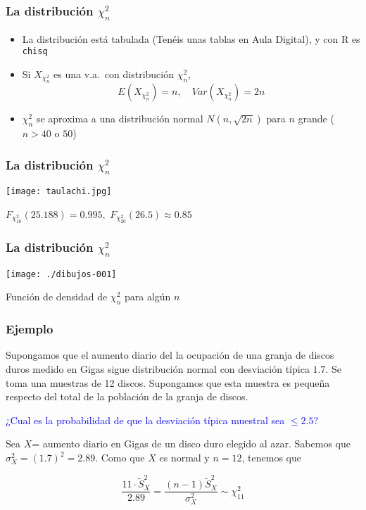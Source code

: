 \documentclass[12pt,t]{beamer}
\newcommand{\blue}[1]{\textcolor{blue}{#1}}
\renewcommand{\emph}[1]{{\color{red}#1}}
\renewcommand{\leq}{\leqslant}
\theoremstyle{plain}
\theoremstyle{definition}
\begin{document}
\begin{frame}
\frametitle{La distribución $\chi_n^2$}

\begin{itemize}
\item La distribución está tabulada (\emph{Tenéis unas tablas en Aula Digital}), y con R es \texttt{chisq}
\bigskip

\item Si $X_{\chi_n^2}$ es una v.a.\ con distribución  $\chi_n^2$,
$$E(X_{\chi_n^2})=n,\quad Var(X_{\chi_n^2})=2 n$$
\medskip

\item ${\chi_n^2}$ se aproxima a una distribución normal $N(n,\sqrt{2n})$ para  $n$ grande
($n>40$ o $50$) 
\end{itemize}

\end{frame}

\begin{frame}
\frametitle{La distribución $\chi_n^2$}
\vspace*{-1cm}

\begin{center}
\texttt{[image: taulachi.jpg]}
\end{center}

$F_{\chi_{10}^2}(25.188)=0.995$,\  $F_{\chi_{20}^2}(26.5)\approx 0.85$

\end{frame}


\begin{frame}
\frametitle{La distribución $\chi_n^2$}
\vspace*{-1cm}

\begin{center}
\texttt{[image: ./dibujos-001]}

Función  de densidad de $\chi^2_n$ para  algún  $n$
\end{center}
\end{frame}

\begin{frame}
\frametitle{Ejemplo}
\vspace*{-2ex}

Supongamos que  el  aumento  diario del la ocupación de una granja de  discos duros medido  en Gigas sigue distribución normal con desviación típica $1.7$. Se toma una muestras de 12 discos. Supongamos que esta  muestra es pequeña respecto del total de la población de la granja de discos.
\medskip

\blue{¿Cual es  la probabilidad de que la desviación típica muestral
sea $\leq 2.5$?}
\medskip

Sea $X$= aumento diario en Gigas de un disco duro elegido al azar. 
Sabemos que $\sigma_{X}^2=(1.7)^2=2.89$. Como que $X$ es normal
 y $n=12$, tenemos que
 
$$
\frac{11\cdot \widetilde{S}_{X}^2}{2.89}=\frac{(n-1)\widetilde{S}_{X}^2}{\sigma_{X}^2}\sim \chi^2_{11}
$$

        
\end{frame}
\end{document}
